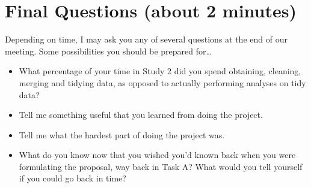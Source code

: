 \documentclass[]{book}
\providecommand{\tightlist}{%
  \setlength{\itemsep}{0pt}\setlength{\parskip}{0pt}}
\theoremstyle{definition}
\theoremstyle{definition}
\theoremstyle{definition}
\theoremstyle{remark}
\begin{document}
\hypertarget{final-questions-about-2-minutes}{%
\section{Final Questions (about 2
minutes)}\label{final-questions-about-2-minutes}}

Depending on time, I may ask you any of several questions at the end of
our meeting. Some possibilities you should be prepared for\ldots{}

\begin{itemize}
\tightlist
\item
  What percentage of your time in Study 2 did you spend obtaining,
  cleaning, merging and tidying data, as opposed to actually performing
  analyses on tidy data?
\item
  Tell me something useful that you learned from doing the project.
\item
  Tell me what the hardest part of doing the project was.
\item
  What do you know now that you wished you'd known back when you were
  formulating the proposal, way back in Task A? What would you tell
  yourself if you could go back in time?
\end{itemize}


\end{document}
